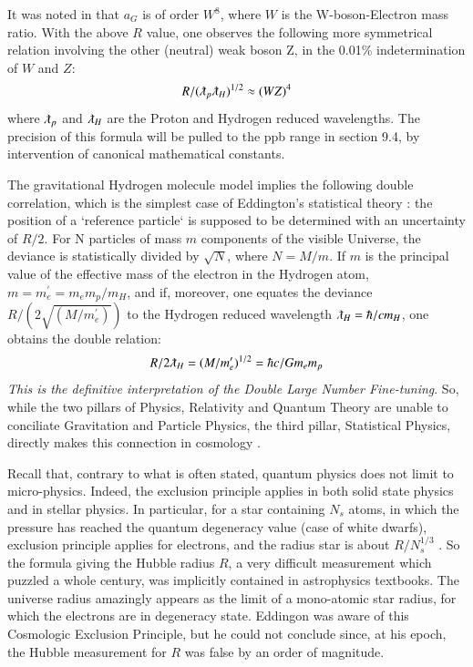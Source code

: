 \documentclass[twoside,draft]{article}
\begin{document}
\begin{sloppypar}
It was noted in \cite{Carr} that $a_{G}$ is of order $W^{8}$, where $W$ is the W-boson-Electron mass ratio. With the above $R$ value, one observes the following more symmetrical relation involving the other (neutral) weak boson Z, in the 0.01\% indetermination of $W$ and $Z$:
\begin{equation}
R/(\lambdabar_{p}\lambdabar_{H})^{1/2}\approx (WZ)^4
\end{equation}
where $\lambdabar_{p}$ and $\lambdabar_{H}$ are the Proton and Hydrogen reduced wavelengths. The precision of this formula will be pulled to the ppb range in section 9.4, by intervention of canonical mathematical constants.

The gravitational Hydrogen molecule model \cite{Sanchez1} implies the following double correlation, which is the simplest case of Eddington's statistical theory \cite{Eddington}: the position of a `reference particle` is supposed to be determined 
with an uncertainty of ${R/2}$. 
For N particles of mass $m$ components of the visible Universe, the deviance is statistically divided by $\sqrt{N}$, where $N = M/m$. If $m$ is the principal value of the effective mass of the electron in the Hydrogen atom, $ m = m^{\prime}_{e} = m_{e} m_p/m_H $, and if, moreover, one equates the deviance $R/(2\sqrt{(M/m^{\prime}_{e})})$ to the Hydrogen reduced wavelength $\lambdabar_{H} = \hbar/c m_{H}$, one obtains the double relation:
\begin{equation}
R/2\lambdabar_{H} = (M/m^{\prime}_{e})^{1/2} = \hbar c/G m_{e} m_{p}
\end{equation}
\textit{This is the definitive interpretation of the Double Large Number Fine-tuning}. 
So, while the two pillars of Physics, Relativity and Quantum Theory are unable to conciliate Gravitation 
and Particle Physics, the third pillar, Statistical Physics, directly makes this connection in cosmology \cite{Eddington}.

Recall that, contrary to what is often stated, quantum physics does not limit to micro-physics. Indeed, the exclusion principle applies in both solid state physics and in stellar physics. In particular, for a star containing $N_s$ atoms, in which the pressure has reached the quantum degeneracy value (case of white dwarfs), exclusion principle applies for electrons, and the radius star is about $R/N_{s}^{1/3}$ \cite{Sanchez1}. So the formula giving the Hubble radius $R$, a very difficult measurement which puzzled a whole century, was implicitly contained in astrophysics textbooks. 
The universe radius amazingly appears as the limit of a mono-atomic star radius, for which the electrons are in degeneracy state. Eddingon was aware of this Cosmologic Exclusion Principle, but he could not conclude since, at his epoch, the Hubble measurement for $R$ was false by an order of magnitude.


\end{sloppypar}
\end{document}
